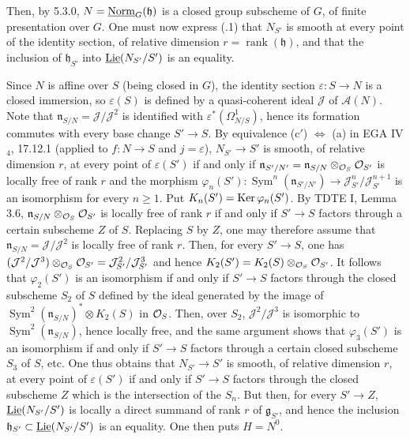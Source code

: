 Then, by 5.3.0, $N=\underline{\mathrm{Norm}}_G(\mathfrak h)$ is a closed group subscheme of $G$, of finite presentation over $G$. One must now express (.1) that $N_{S'}$ is smooth at every point of the identity section, of relative dimension $r=\operatorname{rank}(\mathfrak h)$, and that the inclusion of $\mathfrak h_{S'}$ into $\underline{\operatorname{Lie}}(N_{S'}/S')$ is an equality.

{\renewcommand{\thefootnote}{(51)}}%
Since $N$ is affine over $S$ (being closed in $G$), the identity section $\varepsilon:S\to N$ is a closed immersion, so $\varepsilon(S)$ is defined by a quasi-coherent ideal $\mathcal J$ of $\mathcal A(N)$. Note that $\mathfrak n_{S/N}=\mathcal J/\mathcal J^2$ is identified with $\varepsilon^*(\Omega^1_{N/S})$, hence its formation commutes with every base change $S'\to S$. By equivalence (c$'$) $\Leftrightarrow$ (a) in EGA IV$_4$, 17.12.1 (applied to $f:N\to S$ and $j=\varepsilon$), $N_{S'}\to S'$ is smooth, of relative dimension $r$, at every point of $\varepsilon(S')$ if and only if $\mathfrak n_{S'/N'}=\mathfrak n_{S/N}\otimes_{\mathcal{O}_S}\mathcal{O}_{S'}$ is locally free of rank $r$ and the morphism $\varphi_n(S'):\operatorname{Sym}^n(\mathfrak n_{S'/N'})\to\mathcal J_{S'}^n/\mathcal J_{S'}^{n+1}$ is an isomorphism for every $n\ge1$. Put $K_n(S')=\operatorname{Ker}\varphi_n(S')$. By TDTE I, Lemma 3.6, $\mathfrak n_{S/N}\otimes_{\mathcal{O}_S}\mathcal{O}_{S'}$ is locally free of rank $r$ if and only if $S'\to S$ factors through a certain subscheme $Z$ of $S$. Replacing $S$ by $Z$, one may therefore assume that $\mathfrak n_{S/N}=\mathcal J/\mathcal J^2$ is locally free of rank $r$. Then, for every $S'\to S$, one has $(\mathcal J^2/\mathcal J^3)\otimes_{\mathcal{O}_S}\mathcal{O}_{S'}=\mathcal J_{S'}^2/\mathcal J_{S'}^3$ and hence $K_2(S')=K_2(S)\otimes_{\mathcal{O}_S}\mathcal{O}_{S'}$. It follows that $\varphi_2(S')$ is an isomorphism if and only if $S'\to S$ factors through the closed subscheme $S_2$ of $S$ defined by the ideal generated by the image of $\operatorname{Sym}^2(\mathfrak n_{S/N})^*\otimes K_2(S)$ in $\mathcal{O}_S$. Then, over $S_2$, $\mathcal J^2/\mathcal J^3$ is isomorphic to $\operatorname{Sym}^2(\mathfrak n_{S/N})$, hence locally free, and the same argument shows that $\varphi_3(S')$ is an isomorphism if and only if $S'\to S$ factors through a certain closed subscheme $S_3$ of $S$, etc. One thus obtains that $N_{S'}\to S'$ is smooth, of relative dimension $r$, at every point of $\varepsilon(S')$ if and only if $S'\to S$ factors through the closed subscheme $Z$ which is the intersection of the $S_n$. But then, for every $S'\to Z$, $\underline{\operatorname{Lie}}(N_{S'}/S')$ is locally a direct summand of rank $r$ of $\mathfrak g_{S'}$, and hence the inclusion $\mathfrak h_{S'}\subset\underline{\operatorname{Lie}}(N_{S'}/S')$ is an equality. One then puts $H=N^0$.

